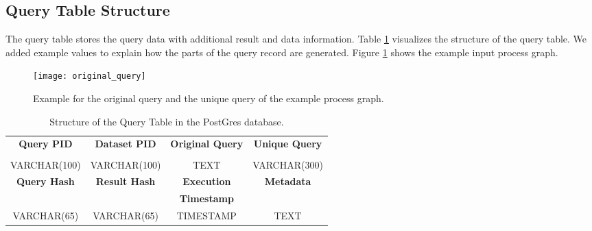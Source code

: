 \documentclass[draft,final]{vutinfth} %
\begin{document}
\subsection{Query Table Structure}

The query table stores the query data with additional result and data information. Table \ref{Tab:querytable} visualizes the structure of the query table. We added example values to explain how the parts of the query record are generated. Figure \ref{fig:processgraph_example} shows the example input process graph.   

\begin{figure}[h]
	\centering
	\texttt{[image: original\_query]}
	\caption{Example for the original query and the unique query of the example process graph.}
	\label{fig:processgraph_example} %
\end{figure} 

\begin{table}[]
	\caption{Structure of the Query Table in the PostGres database.}
	\begin{tabular}{|c|c|c|c|}%
	\hline	\textbf{Query PID} & \textbf{Dataset PID} & \textbf{Original Query} & \textbf{Unique Query} \\ \textbf{} & \textbf{} & \textbf{} & \textbf{} \\ \hline VARCHAR(100) & VARCHAR(100) & TEXT & VARCHAR(300) \\ \hline \hline \textbf{Query Hash} & \textbf{Result Hash} & \textbf{Execution} & \textbf{Metadata}  \\ \textbf{} & \textbf{} & \textbf{Timestamp} & \textbf{}  \\ \hline
		 VARCHAR(65) & VARCHAR(65) & TIMESTAMP & TEXT \\ \hline
	\end{tabular}
	\label{Tab:querytable}
\end{table}
\end{document}
